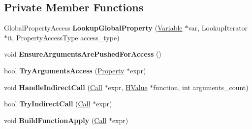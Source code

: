 \subsection*{Private Member Functions}
\begin{DoxyCompactItemize}
\item 
Global\+Property\+Access {\bfseries Lookup\+Global\+Property} (\hyperlink{classv8_1_1internal_1_1_variable}{Variable} $\ast$var, Lookup\+Iterator $\ast$it, Property\+Access\+Type access\+\_\+type)\hypertarget{classv8_1_1internal_1_1_h_optimized_graph_builder_a795b1bfce00b50b1896c3954e3125cb4}{}\label{classv8_1_1internal_1_1_h_optimized_graph_builder_a795b1bfce00b50b1896c3954e3125cb4}

\item 
void {\bfseries Ensure\+Arguments\+Are\+Pushed\+For\+Access} ()\hypertarget{classv8_1_1internal_1_1_h_optimized_graph_builder_af44b08b33c0bd6f1bbed182caba2935d}{}\label{classv8_1_1internal_1_1_h_optimized_graph_builder_af44b08b33c0bd6f1bbed182caba2935d}

\item 
bool {\bfseries Try\+Arguments\+Access} (\hyperlink{classv8_1_1internal_1_1_property}{Property} $\ast$expr)\hypertarget{classv8_1_1internal_1_1_h_optimized_graph_builder_a5dee482ecf2162a34b5b27f09b7848ae}{}\label{classv8_1_1internal_1_1_h_optimized_graph_builder_a5dee482ecf2162a34b5b27f09b7848ae}

\item 
void {\bfseries Handle\+Indirect\+Call} (\hyperlink{classv8_1_1internal_1_1_call}{Call} $\ast$expr, \hyperlink{classv8_1_1internal_1_1_h_value}{H\+Value} $\ast$function, int arguments\+\_\+count)\hypertarget{classv8_1_1internal_1_1_h_optimized_graph_builder_a1ea60fdc138abd8ef223b0f8e218882b}{}\label{classv8_1_1internal_1_1_h_optimized_graph_builder_a1ea60fdc138abd8ef223b0f8e218882b}

\item 
bool {\bfseries Try\+Indirect\+Call} (\hyperlink{classv8_1_1internal_1_1_call}{Call} $\ast$expr)\hypertarget{classv8_1_1internal_1_1_h_optimized_graph_builder_a18848ba107db9478a6fb097e2448b3a4}{}\label{classv8_1_1internal_1_1_h_optimized_graph_builder_a18848ba107db9478a6fb097e2448b3a4}

\item 
void {\bfseries Build\+Function\+Apply} (\hyperlink{classv8_1_1internal_1_1_call}{Call} $\ast$expr)\hypertarget{classv8_1_1internal_1_1_h_optimized_graph_builder_adcdc99f8eabf6fb83fac1604c22d4f48}{}\label{classv8_1_1internal_1_1_h_optimized_graph_builder_adcdc99f8eabf6fb83fac1604c22d4f48}


\end{DoxyCompactItemize}
